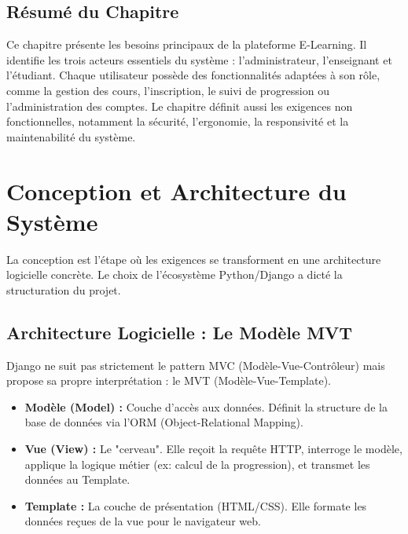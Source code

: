 \documentclass[12pt,a4paper]{report}
\begin{document}
\section*{Résumé du Chapitre}

Ce chapitre présente les besoins principaux de la plateforme E-Learning. Il identifie les trois acteurs essentiels du système : l’administrateur, l’enseignant et l’étudiant. Chaque utilisateur possède des fonctionnalités adaptées à son rôle, comme la gestion des cours, l’inscription, le suivi de progression ou l’administration des comptes. Le chapitre définit aussi les exigences non fonctionnelles, notamment la sécurité, l’ergonomie, la responsivité et la maintenabilité du système.


\chapter{Conception et Architecture du Système}

La conception est l'étape où les exigences se transforment en une architecture logicielle concrète. Le choix de l'écosystème Python/Django a dicté la structuration du projet.

\section{Architecture Logicielle : Le Modèle MVT}
Django ne suit pas strictement le pattern MVC (Modèle-Vue-Contrôleur) mais propose sa propre interprétation : le MVT (Modèle-Vue-Template).
\begin{itemize}
    \item \textbf{Modèle (Model) :} Couche d'accès aux données. Définit la structure de la base de données via l'ORM (Object-Relational Mapping).
    \item \textbf{Vue (View) :} Le "cerveau". Elle reçoit la requête HTTP, interroge le modèle, applique la logique métier (ex: calcul de la progression), et transmet les données au Template.
    \item \textbf{Template :} La couche de présentation (HTML/CSS). Elle formate les données reçues de la vue pour le navigateur web.
\end{itemize}
\end{document}
